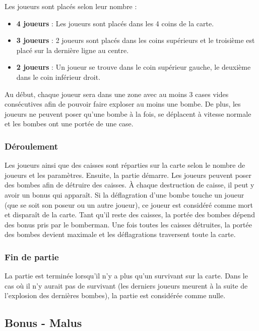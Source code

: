 \vspace{0.5cm}

Les joueurs sont placés selon leur nombre : 
\begin{itemize}
\item \textbf{4 joueurs} : Les joueurs sont placés dans les 4 coins de la carte.
\item \textbf{3 joueurs} : 2 joueurs sont placés dans les coins supérieurs et le troisième est placé sur la dernière ligne au centre.
\item \textbf{2 joueurs} : Un joueur se trouve dans le coin supérieur gauche, le deuxième dans le coin inférieur droit.
\end{itemize}

\vspace{0.5cm}

Au début, chaque joueur sera dans une zone avec au moins 3 cases vides consécutives afin de pouvoir faire exploser au moins une bombe. De plus, les joueurs ne peuvent poser qu'une bombe à la fois, se déplacent à vitesse normale et les bombes ont une portée de une case.

\subsubsection{Déroulement}

Les joueurs ainsi que des caisses sont réparties sur la carte selon le nombre de joueurs et les paramètres. Ensuite, la partie démarre. Les joueurs peuvent poser des bombes afin de détruire des caisses. À chaque destruction de caisse, il peut y avoir un bonus qui apparaît. Si la déflagration d'une bombe touche un joueur (que se soit son poseur ou un autre joueur), ce joueur est considéré comme mort et disparaît de la carte. Tant qu'il reste des caisses, la portée des bombes dépend des bonus pris par le bomberman. Une fois toutes les caisses détruites, la portée des bombes devient maximale et les déflagrations traversent toute la carte.

\subsubsection{Fin de partie}

La partie est terminée lorsqu'il n'y a plus qu'un survivant sur la carte. Dans le cas où il n'y aurait pas de survivant (les derniers joueurs meurent à la suite de l'explosion des dernières bombes), la partie est considérée comme nulle.

\subsection{Bonus - Malus}

